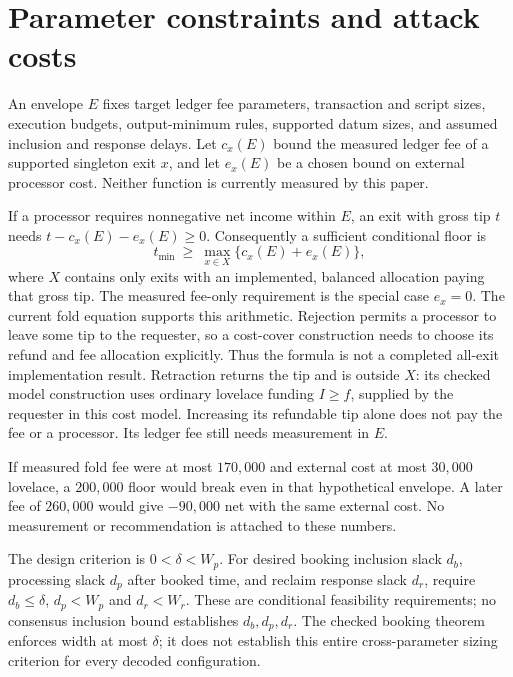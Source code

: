 \section{Parameter constraints and attack costs}
\label{sec:sizing}
\begin{definition}
An envelope $E$ fixes target ledger fee parameters, transaction and script sizes,
execution budgets, output-minimum rules, supported datum sizes, and assumed
inclusion and response delays. Let $c_x(E)$ bound the measured ledger fee of
a supported singleton exit $x$, and let $e_x(E)$ be a chosen bound on external
processor cost. Neither function is currently measured by this paper.
\end{definition}

\proposed If a processor requires nonnegative net income within $E$, an exit
with gross tip $t$ needs $t-c_x(E)-e_x(E)\ge0$. Consequently a sufficient
conditional floor is
\[
 t_{\min}\ \ge\ \max_{x\in X}\{c_x(E)+e_x(E)\},
\]
where $X$ contains only exits with an implemented, balanced allocation paying
that gross tip. The measured fee-only requirement is the special case $e_x=0$.
The current fold equation supports this arithmetic. Rejection permits a
processor to leave some tip to the requester, so a cost-cover construction
needs to choose its refund and fee allocation explicitly. Thus the formula is
not a completed all-exit implementation result. Retraction returns the tip
and is outside $X$: its checked model construction uses ordinary lovelace
funding $I\ge f$, supplied by the requester in this cost model. Increasing
its refundable tip alone does not pay the fee or a processor. Its ledger fee
still needs measurement in $E$.

\hand If measured fold fee were at most $170{,}000$ and external cost at most
$30{,}000$ lovelace, a $200{,}000$ floor would break even in that hypothetical
envelope. A later fee of $260{,}000$ would give $-90{,}000$ net with the same
external cost. No measurement or recommendation is attached to these numbers.

\proposed The design criterion is $0<\delta<W_p$. For desired booking
inclusion slack $d_b$, processing slack $d_p$ after booked time, and reclaim
response slack $d_r$, require $d_b\le\delta$, $d_p<W_p$ and $d_r<W_r$.
These are conditional feasibility requirements; no consensus inclusion bound
establishes $d_b,d_p,d_r$. The checked booking theorem enforces width at most
$\delta$; it does not establish this entire cross-parameter sizing criterion
for every decoded configuration.

